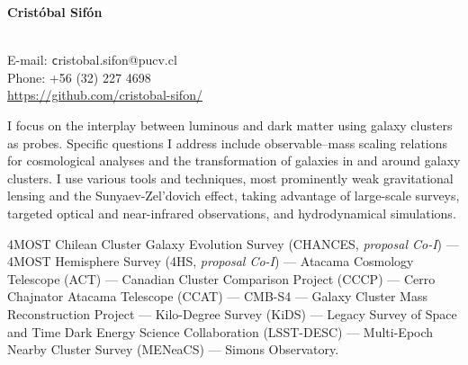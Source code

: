\documentclass[11pt]{article}
\begin{document}
\begin{minipage}[b]{0.46\linewidth}
\flushleft
\hspace{-0.7cm}
{\bf\huge Crist\'obal Sif\'on}\\\vspace{0.2cm}
\\
\end{minipage}
\begin{minipage}[b]{0.49\linewidth}
\flushright
{\large E-mail: {\texttt cristobal.sifon@pucv.cl}\\
        Phone: +56 (32) 227 4698\\
        \url{https://github.com/cristobal-sifon/}}
\end{minipage}
\vspace{0.4cm}
\hline




I focus on the interplay between luminous and dark matter using galaxy clusters as probes. Specific questions I address include observable--mass scaling relations for cosmological analyses and the transformation of galaxies in and around galaxy clusters. I use various tools and techniques, most prominently weak gravitational lensing and the Sunyaev-Zel'dovich effect, taking advantage of large-scale surveys, targeted optical and near-infrared observations, and hydrodynamical simulations.

\vspace{0.5cm}
{
 4MOST Chilean Cluster Galaxy Evolution Survey (CHANCES, \textit{proposal Co-I}) ---
 4MOST Hemisphere Survey (4HS, \textit{proposal Co-I}) ---
 Atacama Cosmology Telescope (ACT) ---
 Canadian Cluster Comparison Project (CCCP) ---
 Cerro Chajnator Atacama Telescope (CCAT) ---
 CMB-S4 ---
 Galaxy Cluster Mass Reconstruction Project ---
 Kilo-Degree Survey (KiDS) ---
 Legacy Survey of Space and Time Dark Energy Science Collaboration (LSST-DESC) ---
 Multi-Epoch Nearby Cluster Survey (MENeaCS) ---
 Simons Observatory.
}
\end{document}
